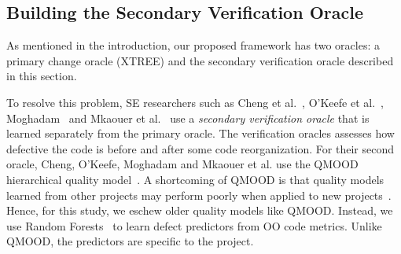 \documentclass[twocolumn,5p]{elsarticle}
\newcommand{\rahul}[1]{{\color{steel}{#1}}}
\theoremstyle{break}
\begin{document}
	
	
	
	\subsection{Building the Secondary Verification Oracle}
	\label{sect:eval}
	
	As mentioned in the introduction, our proposed framework has two oracles:
	a primary change oracle (XTREE) and the secondary verification oracle 
	described in this section.
	
	\rahul{
	It can be difficult  to judge the  effects of removing bad 
	smells.
	Code that is reorganized cannot be assessed just by a rerun of the test
	suite for three reasons: (1) Test suites may not 
	be 
	designed to identify code smells, they only report pass/fail based on 
	whether or not a specific module runs. It is entirely possible that a test 
	case may pass for code that contains one or more code smells; (2) While 
	smells are certainly symptomatic of design flaws, not all smells cause the 
	system to fail in manner suitable for identification by test cases; and (3) 
	It make take a significant amount of effort to write new test cases that 
	identify bad smells, especially for relatively stable software systems. 
	Additionally, since we 
	can not be sure if reorganizations do/don't change the system behavior, for 
	instance cases where a reorganization effort involves only refactoring, it 
	becomes difficult to assert when a test case will pass or fail.}

		
		
	To resolve this problem, SE researchers such as
	Cheng et al.~\cite{Cheng10}, O'Keefe et al.~\cite{OKeeffe08,OKeeffe07},
	Moghadam~\cite{Moghadam2011} and Mkaouer et al.~\cite{Mkaouer14}
	use a {\em secondary verification oracle} that is learned separately
	from the primary oracle. The verification oracles assesses
	how defective the code is before and after some
	code reorganization.
	For their second oracle,
	Cheng, O'Keefe, Moghadam and  Mkaouer et al. use the QMOOD hierarchical
	quality model~\cite{Bansiya02}.
	A shortcoming of QMOOD
	is that quality models learned from other projects
	may perform poorly when applied to new projects~\cite{me12d}.
	Hence, for this study, we  eschew
	older quality models like QMOOD. Instead, we use
	Random Forests~\cite{Breiman2001} to learn defect predictors
	from OO code metrics.
	Unlike QMOOD, the predictors
	are specific to the project.
	
\end{document}
